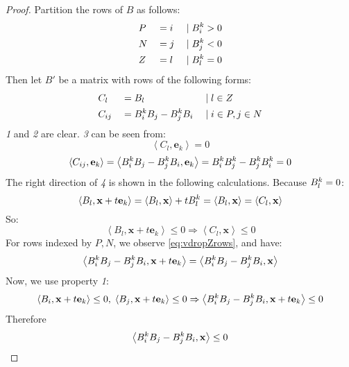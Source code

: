 \documentclass[fleqn]{article}
\renewcommand{\vec}[1]{\mathbf{#1}}
\newcommand{\ip}[2]{\left\langle #1, #2 \right\rangle}
\newcommand{\0}{\vec{0}}
\newcommand{\x}{\vec{x}}
\newcommand{\e}{\vec{e}}
\newcommand{\st}{\;|\;}
\begin{document}
\begin{proof}
  Partition the rows of $B$ as follows:
  \begin{alignat*}{3}
  &P &&= i &\st &\Bik > 0 \\
  &N &&= j &\st &\Bjk < 0 \\
  &Z &&= l &\st &\Blk = 0
  \end{alignat*}
  Then let $B'$ be a matrix with rows of the following forms:
  \begin{alignat*}{3}
    &C_l    &&= B_l &\st &l \in Z \\
    &C_{ij} &&= \Bik B_j - \Bjk B_i &\st &i \in P, j \in N
  \end{alignat*}
  \textit{1} and \textit{2} are clear.  \textit{3} can be seen from:
  \[ \ip{C_l}{\e_k} = 0 \]
  \begin{equation}\label{eq:vdropZrows}
  \ip{C_{ij}}{\e_k} = \ip{\Bik B_j - \Bjk B_i}{\e_k} = \Bik \Bjk - \Bjk \Bik = 0
  \end{equation}
  The right direction of \textit{4} is shown in the following calculations.  Because $B^k_l = 0$:
  \[ \ip{B_l}{\x+t\e_k} = \ip{B_l}{\x} + t\Blk = \ip{B_l}{\x} = \ip{C_l}{\x} \]
  So:
  \[ \ip{B_l}{\x+t\e_k} \leq 0 \Rightarrow \ip{C_l}{\x} \leq 0 \]
  For rows indexed by $P,N$, we observe \eqref{eq:vdropZrows}, and have:
  \[ \ip{\Bik B_j - \Bjk B_i}{\x + t\e_k} = \ip{\Bik B_j - \Bjk B_i}{\x} \]
  Now, we use property \textit{1}:
  \[ \ip{B_i}{\x+t\e_k} \leq 0,\; \ip{B_j}{\x+t\e_k} \leq 0 \Rightarrow 
     \ip{\Bik B_j - \Bjk B_i}{\x + t\e_k} \leq 0\]
  Therefore 
  \[ \ip{\Bik B_j - \Bjk B_i}{\x} \leq 0 \]
     

\end{proof}
\end{document}
